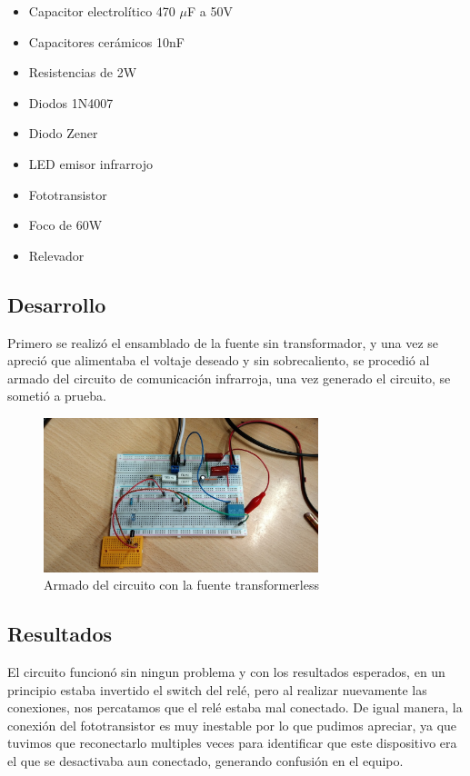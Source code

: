 \begin{itemize}
    \item Capacitor electrolítico 470 $\mu$F a 50V
    \item Capacitores cerámicos 10nF
    \item Resistencias de 2W
    \item Diodos 1N4007
    \item Diodo Zener
    \item LED emisor infrarrojo
    \item Fototransistor
    \item Foco de 60W
    \item Relevador
\end{itemize}

\subsection{Desarrollo}

Primero se realizó el ensamblado de la fuente sin transformador, y una vez se apreció que alimentaba el voltaje deseado y sin sobrecaliento, se procedió al armado del circuito
de comunicación infrarroja, una vez generado el circuito, se sometió a prueba.

\begin{figure}[htb]
    \centering
    \includegraphics[width=8cm]{media/Practica4.jpg}
    \caption{Armado del circuito con la fuente transformerless}
\end{figure}

\subsection{Resultados}

El circuito funcionó sin ningun problema y con los resultados esperados, en un principio estaba invertido el switch del relé, pero al realizar nuevamente las conexiones, nos
percatamos que el relé estaba mal conectado. De igual manera, la conexión del fototransistor es muy inestable por lo que pudimos apreciar, ya que tuvimos que reconectarlo multiples veces
para identificar que este dispositivo era el que se desactivaba aun conectado, generando confusión en el equipo.

